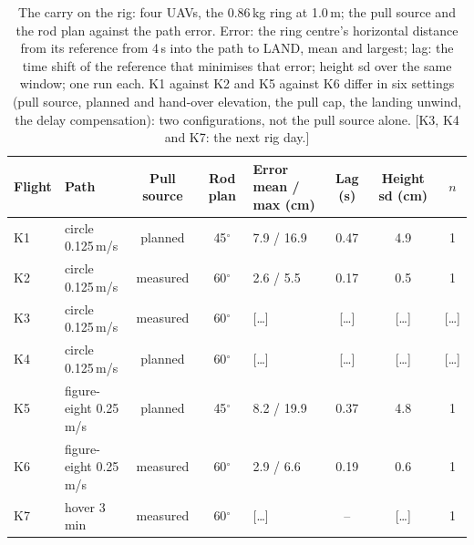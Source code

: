 \begin{table}[htbp]
  \centering
  \footnotesize
  \caption[The carry on the rig]{The carry on the rig: four UAVs, the 0.86\,kg ring at 1.0\,m; the pull source and the
  rod plan against the path error. Error: the ring centre's horizontal distance from its reference from 4\,s into the
  path to LAND, mean and largest; lag: the time shift of the reference that minimises that error; height sd over the
  same window; one run each. K1 against K2 and K5 against K6 differ in six settings (pull source, planned and
  hand-over elevation, the pull cap, the landing unwind, the delay compensation): two configurations, not the pull
  source alone. [K3, K4 and K7: the next rig day.]}
  \label{tab:T7}
  \begin{tabularx}{\textwidth}{lYccYccc}
    \toprule
    Flight & Path & Pull source & Rod plan & Error mean / max (cm) & Lag (s) & Height sd (cm) & $n$ \\
    \midrule
    K1 & circle 0.125\,m/s & planned & 45$^\circ$ & 7.9 / 16.9 & 0.47 & 4.9 & 1 \\ %
    K2 & circle 0.125\,m/s & measured & 60$^\circ$ & 2.6 / 5.5 & 0.17 & 0.5 & 1 \\ %
    K3 & circle 0.125\,m/s & measured & 60$^\circ$ & [\dots] & [\dots] & [\dots] & [\dots] \\ %
    K4 & circle 0.125\,m/s & planned & 60$^\circ$ & [\dots] & [\dots] & [\dots] & [\dots] \\ %
    K5 & figure-eight 0.25\,m/s & planned & 45$^\circ$ & 8.2 / 19.9 & 0.37 & 4.8 & 1 \\ %
    K6 & figure-eight 0.25\,m/s & measured & 60$^\circ$ & 2.9 / 6.6 & 0.19 & 0.6 & 1 \\ %
    K7 & hover 3 min & measured & 60$^\circ$ & [\dots] & -- & [\dots] & 1 \\ %
    \bottomrule
  \end{tabularx}
\end{table}

